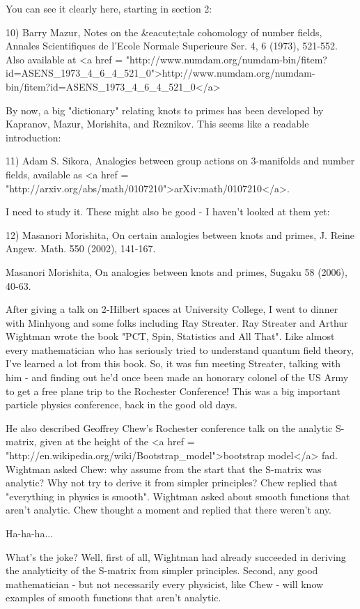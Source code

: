 You can see it clearly here, starting in section 2:

10) Barry Mazur, Notes on the &eacute;tale cohomology of number fields,
Annales Scientifiques de l'Ecole Normale Superieure Ser. 4, 
6 (1973), 521-552.  Also available at
<a href = "http://www.numdam.org/numdam-bin/fitem?id=ASENS_1973_4_6_4_521_0">http://www.numdam.org/numdam-bin/fitem?id=ASENS_1973_4_6_4_521_0</a>

By now, a big "dictionary" relating knots to primes has been 
developed by Kapranov, Mazur, Morishita, and Reznikov.  This 
seems like a readable introduction:

11) Adam S. Sikora, Analogies between group actions on 3-manifolds
and number fields, available as <a href = "http://arxiv.org/abs/math/0107210">arXiv:math/0107210</a>.

I need to study it.  These might also be good - I haven't looked
at them yet:

12) Masanori Morishita, On certain analogies between knots and 
primes, J. Reine Angew. Math. 550 (2002), 141-167.

Masanori Morishita, On analogies between knots and primes, 
Sugaku 58 (2006), 40-63.

After giving a talk on 2-Hilbert spaces at University College,
I went to dinner with Minhyong and some folks including Ray 
Streater.
Ray Streater and Arthur Wightman wrote the book "PCT, Spin, 
Statistics and All That".  Like almost every mathematician who 
has seriously tried to understand quantum field theory, I've 
learned a lot from this book.  So, it was fun meeting Streater, 
talking with him - and finding out he'd once been made an honorary 
colonel of the US Army to get a free plane trip to the Rochester 
Conference!  This was a big important particle physics conference, 
back in the good old days.

He also described Geoffrey Chew's Rochester conference talk on the 
analytic S-matrix, given at the height of the <a href = "http://en.wikipedia.org/wiki/Bootstrap_model">bootstrap model</a> fad. 
Wightman asked Chew: why assume from the start that the S-matrix was 
analytic?  Why not try to derive it from simpler principles?  Chew 
replied that "everything in physics is smooth".  Wightman asked about
smooth functions that aren't analytic.  Chew thought a moment and 
replied that there weren't any.

Ha-ha-ha...

What's the joke?   Well, first of all, Wightman had already succeeded
in deriving the analyticity of the S-matrix from simpler principles. 
Second, any good mathematician - but not necessarily every physicist, 
like Chew - will know examples of smooth functions that aren't 
analytic. 

